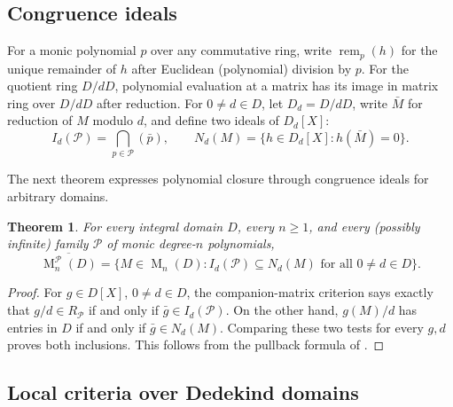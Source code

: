 \documentclass[11pt]{amsart}
\newtheorem{theorem}{Theorem}[section]
\theoremstyle{definition}
\theoremstyle{remark}
\newcommand{\Mat}{\operatorname{M}}
\newcommand{\rem}{\operatorname{rem}}
\begin{document}
\subsection{Congruence ideals}
For a monic polynomial $p$ over any commutative ring, write
$\rem_p(h)$ for the unique remainder of $h$ after Euclidean
(polynomial) division by $p$. For the quotient ring $D/dD$,
polynomial evaluation at a matrix has its image in matrix ring over $D/dD$ after reduction.
For $0\ne d\in D$, let $D_d=D/dD$, write $\bar M$ for reduction of $M$ modulo $d$,
and define two ideals of $D_d[X]$:
\[
I_d(\mathcal P)=\bigcap_{p\in\mathcal P}(\bar p),\qquad
N_d(M)=\{h\in D_d[X]:h(\bar M)=0\}.
\]

The next theorem expresses polynomial closure through congruence ideals for arbitrary domains.
\begin{theorem}\label{thm:global}
For every integral domain $D$, every $n\ge1$, and every (possibly infinite)
family $\mathcal P$ of monic degree-$n$ polynomials,
\begin{equation}\label{eq:all}
\overline{\Mat_n^{\mathcal P}(D)}
 =\{M\in\Mat_n(D):I_d(\mathcal P)\subseteq N_d(M)
                 \text{ for all }0\ne d\in D\}.
\end{equation}
\end{theorem}
\begin{proof}
For $g\in D[X]$, $0\ne d\in D$, the companion-matrix criterion
says exactly that $g/d\in R_{\mathcal P}$ if and only if
$\bar g\in I_d(\mathcal P)$. On the other hand, $g(M)/d$ has entries in
$D$ if and only if $\bar g\in N_d(M)$. Comparing these two tests for every
$g,d$ proves both inclusions. This follows from the pullback formula of \cite[Proposition~2.1]{Peruginelli2014}.
\end{proof}

\subsection{Local criteria over Dedekind domains}
\end{document}
